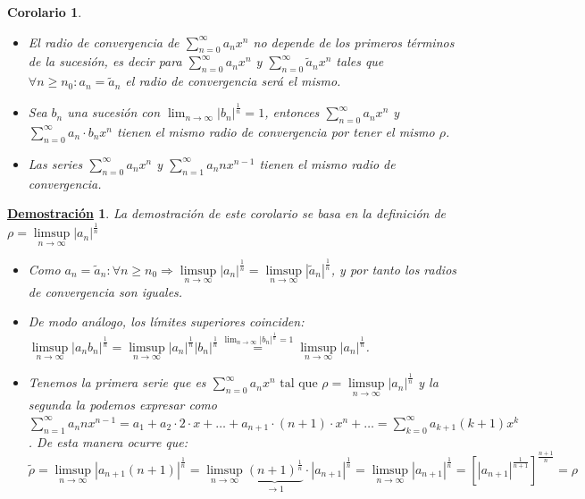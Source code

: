 \documentclass[10pt,a4paper,openright]{book}
\theoremstyle{break}
\newtheorem{coro}{Corolario}[theo]
\newtheorem*{demo}{\underline{Demostración}}
\begin{document}
\begin{coro}
\begin{itemize}
\item El radio de convergencia de $\sum_{n=0}^{\infty} a_n x^n$ no depende de los primeros términos de la sucesión, es decir para $\sum_{n=0}^{\infty} a_n x^n$  y $\sum_{n=0}^{\infty} \tilde{a}_n x^n$ tales que $\forall n \geq n_0 : a_n = \tilde{a}_n $ el radio de convergencia será el mismo.

\item Sea $b_n$ una sucesión con $\lim_{n \to \infty} |b_n|^\frac{1}{n} = 1$, entonces $\sum_{n=0}^{\infty} a_n x^n$ y $\sum_{n=0}^{\infty} a_n \cdot b_n x^n$ tienen el mismo radio de convergencia por tener el mismo $\rho$.

\item Las series $\sum_{n=0}^{\infty} a_n x^n$ y $\sum_{n=1}^{\infty} a_n n x^{n-1}$ tienen el mismo radio de convergencia.
\end{itemize}
\end{coro}
\begin{demo}
La demostración de este corolario se basa en la definición de $\rho = \underset{n \to \infty}\limsup |a_n|^{\frac{1}{n}}$
\begin{itemize}
\item Como $a_n = \tilde{a}_n : \forall n \geq n_0 \Rightarrow \underset{n \to \infty}\limsup |a_n|^{\frac{1}{n}} = \underset{n \to \infty}\limsup |\tilde{a}_n|^{\frac{1}{n}}$, y por tanto los radios de convergencia son iguales.

\item De modo análogo, los límites superiores coinciden: $\underset{n \to \infty}\limsup |a_n b_n|^{\frac{1}{n}} = \underset{n \to \infty}\limsup |a_n|^{\frac{1}{n}} |b_n|^{\frac{1}{n}} \overset{\lim_{n \to \infty} |b_n|^\frac{1}{n} = 1}{=} \underset{n \to \infty}\limsup |a_n|^{\frac{1}{n}}$.

\item Tenemos la primera serie que es $\sum_{n=0}^{\infty} a_n x^n \mbox{ tal que } \rho = \underset{n \to \infty}\limsup |a_n|^{\frac{1}{n}}$ y la segunda la podemos expresar como $\sum_{n=1}^{\infty} a_n n x^{n-1} = a_1 + a_2 \cdot 2 \cdot x + \ldots + a_{n+1} \cdot (n+1) \cdot x^n + \ldots = \sum_{k=0}^{\infty} a_{k+1}(k+1) x^k$. De esta manera ocurre que:
$$\tilde{\rho} = \underset{n \to \infty}\limsup |a_{n+1} (n+1)|^\frac{1}{n} = \underset{n \to \infty}\limsup \underbrace{(n+1)^\frac{1}{n}}_{\to 1} \cdot |a_{n+1}|^\frac{1}{n} = \underset{n \to \infty}\limsup |a_{n+1}|^\frac{1}{n} = [|a_{n+1}|^\frac{1}{n+1}]^\frac{n+1}{n} = \rho$$
\end{itemize}
\end{demo}
\end{document}
